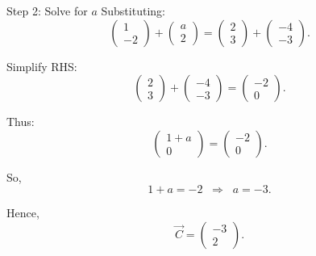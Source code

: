 \documentclass{beamer}
\begin{document}
\begin{frame}{Step 2: Solve for $a$}
Substituting:
\begin{equation}
\begin{pmatrix}1\\-2\end{pmatrix}+\begin{pmatrix}a\\2\end{pmatrix}
=\begin{pmatrix}2\\3\end{pmatrix}+\begin{pmatrix}-4\\-3\end{pmatrix}.
\end{equation}

Simplify RHS:
\begin{equation}
\begin{pmatrix}2\\3\end{pmatrix}+\begin{pmatrix}-4\\-3\end{pmatrix}
=\begin{pmatrix}-2\\0\end{pmatrix}.
\end{equation}

Thus:
\begin{equation}
\begin{pmatrix}1+a\\0\end{pmatrix}=\begin{pmatrix}-2\\0\end{pmatrix}.
\end{equation}

So,
\begin{equation}
1+a=-2 \;\;\Longrightarrow\;\; a=-3.
\end{equation}

Hence,
\begin{equation}
\vec C=\begin{pmatrix}-3\\2\end{pmatrix}.
\end{equation}
\end{frame}
\end{document}
